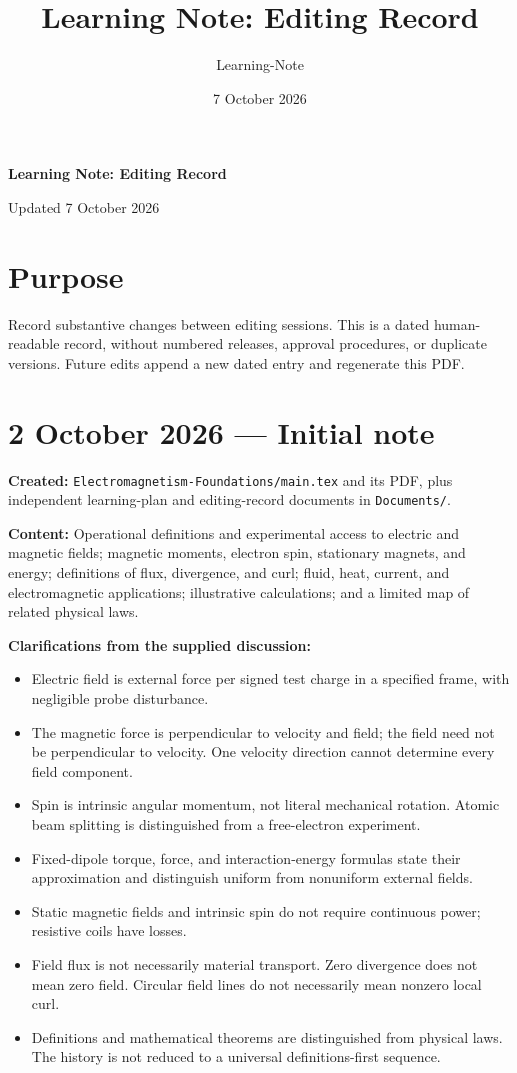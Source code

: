 \documentclass[11pt,letterpaper]{article}
\title{Learning Note: Editing Record}\author{Learning-Note}\date{7 October 2026}
\begin{document}
\begin{center}
{\Large\bfseries Learning Note: Editing Record}\par
Updated 7 October 2026
\end{center}
\section*{Purpose}
Record substantive changes between editing sessions. This is a dated human-readable record, without numbered releases, approval procedures, or duplicate versions. Future edits append a new dated entry and regenerate this PDF.

\section*{2 October 2026 --- Initial note}
\textbf{Created:} \texttt{Electromagnetism-Foundations/main.tex} and its PDF, plus independent learning-plan and editing-record documents in \texttt{Documents/}.

\textbf{Content:} Operational definitions and experimental access to electric and magnetic fields; magnetic moments, electron spin, stationary magnets, and energy; definitions of flux, divergence, and curl; fluid, heat, current, and electromagnetic applications; illustrative calculations; and a limited map of related physical laws.

\textbf{Clarifications from the supplied discussion:}
\begin{itemize}
\item Electric field is external force per signed test charge in a specified frame, with negligible probe disturbance.
\item The magnetic force is perpendicular to velocity and field; the field need not be perpendicular to velocity. One velocity direction cannot determine every field component.
\item Spin is intrinsic angular momentum, not literal mechanical rotation. Atomic beam splitting is distinguished from a free-electron experiment.
\item Fixed-dipole torque, force, and interaction-energy formulas state their approximation and distinguish uniform from nonuniform external fields.
\item Static magnetic fields and intrinsic spin do not require continuous power; resistive coils have losses.
\item Field flux is not necessarily material transport. Zero divergence does not mean zero field. Circular field lines do not necessarily mean nonzero local curl.
\item Definitions and mathematical theorems are distinguished from physical laws. The history is not reduced to a universal definitions-first sequence.
\end{itemize}
\end{document}
